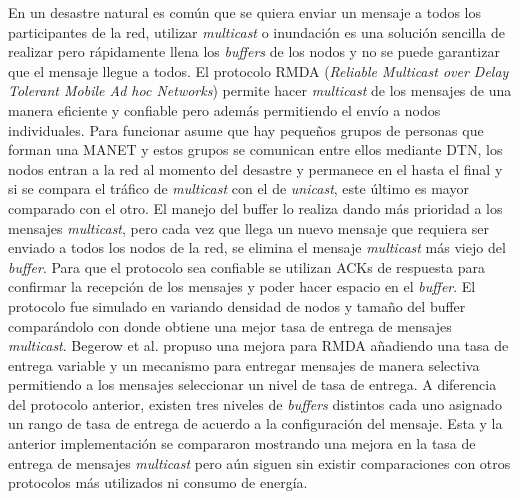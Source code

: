 En un desastre natural es común que se quiera enviar un mensaje a todos los
participantes de la red, utilizar \textit{multicast} o inundación es una solución
sencilla de realizar pero rápidamente llena los \textit{buffers} de los nodos y
no se puede garantizar que el mensaje llegue a todos. El protocolo RMDA
(\textit{Reliable Multicast over Delay Tolerant Mobile Ad hoc Networks})
\cite{DBLP:conf/msn/BegerowKSS14} permite hacer \textit{multicast} de los
mensajes de una manera eficiente y confiable pero además permitiendo el envío a
nodos individuales. Para funcionar asume que hay pequeños grupos de personas que
forman una MANET y estos grupos se comunican entre ellos mediante DTN, los nodos
entran a la red al momento del desastre y permanece en el hasta el final y si se
compara el tráfico de \textit{multicast} con el de \textit{unicast}, este último
es mayor comparado con el otro. El manejo del buffer lo realiza dando más
prioridad a los mensajes \textit{multicast}, pero cada vez que llega un nuevo
mensaje que requiera ser enviado a todos los nodos de la red, se elimina el
mensaje \textit{multicast} más viejo del \textit{buffer}. Para que el protocolo
sea confiable se utilizan ACKs de respuesta para confirmar la recepción de los
mensajes y poder hacer espacio en el \textit{buffer}.  El protocolo fue simulado
en \theone{} variando densidad de nodos y tamaño del buffer comparándolo con
\epidemic{} donde obtiene una mejor tasa de entrega de mensajes
\textit{multicast}. Begerow et al. propuso una mejora para RMDA \cite{Begerow2015}
añadiendo una tasa de entrega variable y un mecanismo para entregar mensajes de
manera selectiva permitiendo a los mensajes seleccionar un nivel de tasa de
entrega. A diferencia del protocolo anterior, existen tres niveles de
\textit{buffers} distintos cada uno asignado un rango de tasa de entrega de
acuerdo a la configuración del mensaje. Esta y la anterior implementación se
compararon mostrando una mejora en la tasa de entrega de mensajes
\textit{multicast} pero aún siguen sin existir comparaciones con otros
protocolos más utilizados ni consumo de energía.


